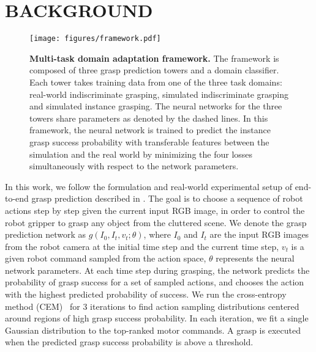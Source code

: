 \documentclass[letterpaper, 10 pt, conference]{ieeeconf}  %
\begin{document}
\section{BACKGROUND}\begin{figure*}[ht]
\centering
\texttt{[image: figures/framework.pdf]}
\caption{\textbf{Multi-task domain adaptation framework.} The framework is composed of three grasp prediction towers and a domain classifier. Each tower takes training data from one of the three task domains: real-world indiscriminate grasping, simulated indiscriminate grasping and simulated instance grasping. The neural networks for the three towers share parameters as denoted by the dashed lines. In this framework, the neural network is trained to predict the instance grasp success probability with transferable features between the simulation and the real world by minimizing the four losses simultaneously with respect to the network parameters.}
\vspace{-4mm}
\label{fig:domain_adaptation_framework}
\end{figure*}%
In this work, we follow the formulation and real-world experimental setup of end-to-end grasp prediction described in \cite{levine2016learning}. The goal is to choose a sequence of robot actions step by step given the current input RGB image, in order to control the robot gripper to grasp any object from the cluttered scene. We denote the grasp prediction network as $g(I_0, I_t, v_t; \theta)$, where $I_0$ and $I_t$ are the input RGB images from the robot camera at the initial time step and the current time step, $v_t$ is a given robot command sampled from the action space, $\theta$ represents the neural network parameters. At each time step during grasping, the network predicts the probability of grasp success for a set of sampled actions, and chooses the action with the highest predicted probability of success. We run the cross-entropy method (CEM)~\cite{rubinstein2004cross} for 3 iterations to find action sampling distributions centered around regions of high grasp success probability. In each iteration, we fit a single Gaussian distribution to the top-ranked motor commands. A grasp is executed when the predicted grasp success probability is above a threshold.
\end{document}
